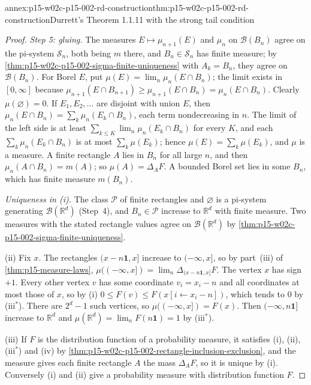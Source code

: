 \begin{annexitem}{annex:p15-w02c-p15-002-rd-construction}{thm:p15-w02c-p15-002-rd-construction}{Durrett's Theorem 1.1.11 with the strong tail condition}
\begin{proof}
\emph{Step 5: gluing.} The measures \(E\mapsto\mu_{n+1}(E)\) and \(\mu_n\)
on \(\mathcal B(B_n)\) agree on the pi-system \(\mathcal S_n\), both being
\(m\) there, and \(B_n\in\mathcal S_n\) has finite measure; by
\cref{thm:p15-w02c-p15-002-sigma-finite-uniqueness} with \(A_k=B_n\), they
agree on \(\mathcal B(B_n)\). For Borel \(E\), put
\(\mu(E)=\lim_n\mu_n(E\cap B_n)\); the limit exists in \([0,\infty]\)
because \(\mu_{n+1}(E\cap B_{n+1})\geq\mu_{n+1}(E\cap B_n)=\mu_n(E\cap B_n)\).
Clearly \(\mu(\varnothing)=0\). If \(E_1,E_2,\ldots\) are disjoint with
union \(E\), then
\(\mu_n(E\cap B_n)=\sum_k\mu_n(E_k\cap B_n)\), each term nondecreasing in
\(n\). The limit of the left side is at least
\(\sum_{k\leq K}\lim_n\mu_n(E_k\cap B_n)\) for every \(K\), and each
\(\sum_k\mu_n(E_k\cap B_n)\) is at most \(\sum_k\mu(E_k)\); hence
\(\mu(E)=\sum_k\mu(E_k)\), and \(\mu\) is a measure. A finite rectangle
\(A\) lies in \(B_n\) for all large \(n\), and then
\(\mu_n(A\cap B_n)=m(A)\); so \(\mu(A)=\Delta_AF\). A bounded Borel set
lies in some \(B_n\), which has finite measure \(m(B_n)\).

\emph{Uniqueness in (i).} The class \(\mathcal P\) of finite rectangles and
\(\varnothing\) is a pi-system generating \(\mathcal B(\mathbb R^d)\)
(Step~4), and \(B_n\in\mathcal P\) increase to \(\mathbb R^d\) with finite
measure. Two measures with the stated rectangle values agree on
\(\mathcal B(\mathbb R^d)\) by
\cref{thm:p15-w02c-p15-002-sigma-finite-uniqueness}.

(ii) Fix \(x\). The rectangles \((x-n\mathbf1,x]\) increase to
\((-\infty,x]\), so by part~(iii) of \cref{thm:p15-measure-laws},
\(\mu((-\infty,x])=\lim_n\Delta_{(x-n\mathbf1,x]}F\). The vertex \(x\)
has sign \(+1\). Every other vertex \(v\) has some coordinate
\(v_i=x_i-n\) and all coordinates at most those of \(x\), so by (i)
\(0\leq F(v)\leq F(x[i\gets x_i-n])\), which tends to \(0\) by
(iii\(^*\)). There are \(2^d-1\) such vertices, so
\(\mu((-\infty,x])=F(x)\). Then \((-\infty,n\mathbf1]\) increase to
\(\mathbb R^d\) and \(\mu(\mathbb R^d)=\lim_nF(n\mathbf1)=1\) by
(iii\(^*\)).

(iii) If \(F\) is the distribution function of a probability measure, it
satisfies (i), (ii), (iii\(^*\)) and (iv) by
\cref{thm:p15-w02c-p15-002-rectangle-inclusion-exclusion}, and the measure
gives each finite rectangle \(A\) the mass \(\Delta_AF\), so it is unique
by (i). Conversely (i) and (ii) give a probability measure with
distribution function \(F\).
\end{proof}
\end{annexitem}

